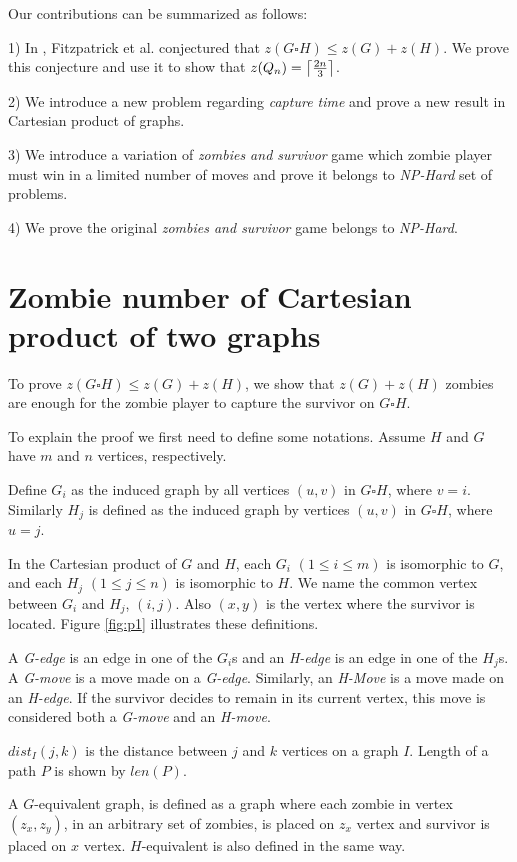 \documentclass[1p]{elsarticle}
\DeclarePairedDelimiter\ceil{\lceil}{\rceil} \DeclarePairedDelimiter\floor{\lfloor}{\rfloor}
\begin{document}
Our contributions can be summarized as follows:

1) In \cite{Fitz16}, Fitzpatrick et al. conjectured that $z(G \square H) \leq z(G) + z(H)$. We prove this conjecture and
use it to show that $z(Q_n) = \ceil*{\frac{2n}{3}}$. 

2) We introduce a new problem regarding {\it capture time} and prove a new result in Cartesian product of graphs.

3) We introduce a variation of {\it zombies and survivor} game which zombie player must win in a limited number of
moves and prove it belongs to {\it NP-Hard} set of problems.

4) We prove the original {\it zombies and survivor} game belongs to {\it NP-Hard}.


\section{Zombie number of Cartesian product of two graphs}\label{conj-proof}

To prove $z(G \square H) \leq z(G) + z(H)$, we show that $z(G) + z(H)$ zombies are enough for the zombie player to
capture the survivor on $G \square H$.

To explain the proof we first need to define some notations. Assume $H$ and $G$ have $m$ and $n$ vertices,
respectively. 

Define $G_{i}$ as the induced graph by all vertices $(u,v)$ in $G \square H$, where $v=i$. Similarly
$H_{j}$ is defined as the induced graph by vertices $(u,v)$ in $G \square H$, where $u=j$.

In the Cartesian product of $G$ and $H$, each $G_{i}$ $(1 \leq i \leq m)$ is isomorphic to $G$, and each $H_{j}$ $(1
\leq j \leq n)$ is isomorphic to $H$. We name the common vertex between $G_{i}$ and $H_{j}$, $(i,j)$. Also $(x,y)$ is
the vertex where the survivor is located. Figure \ref{fig:p1} illustrates these definitions.

A {\it G-edge} is an edge in one of the $G_{i}$s and an {\it H-edge} is an edge in one of the $H_{j}$s. A {\it G-move}
is a move made on a {\it G-edge}. Similarly, an {\it H-Move} is a move made on an {\it H-edge}. If the survivor decides
to remain in its current vertex, this move is considered both a {\it G-move} and an {\it H-move}. 

$dist_I(j,k)$ is the distance between $j$ and $k$ vertices on a graph $I$. Length of a path $P$ is shown by $len(P)$. 

A $G$-equivalent graph, is defined as a graph where each zombie in vertex $(z_x,z_y)$, in an arbitrary set of zombies,
is placed on $z_x$ vertex and survivor is placed on $x$ vertex. $H$-equivalent is also defined in the same way. 
\end{document}
